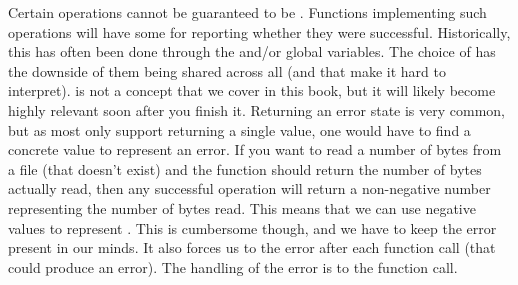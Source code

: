 Certain operations cannot be guaranteed to be . Functions implementing such operations will have some  for reporting whether they were successful. Historically, this has often been done through the  and/or global variables. The choice of  has the downside of them being shared across all  (and that make it hard to interpret).  is not a concept that we cover in this book, but it will likely become highly relevant soon after you finish it. Returning an error state is very common, but as most  only support returning a single value, one would have to find a concrete value to represent an error. If you want to read a number of bytes from a file (that doesn't exist) and the function should return the number of bytes actually read, then any successful operation will return a non-negative number representing the number of bytes read. This means that we can use negative values to represent . This is cumbersome though, and we have to keep the error  present in our minds. It also forces us to  the error after each function call (that could produce an error). The handling of the error is  to the function call.

